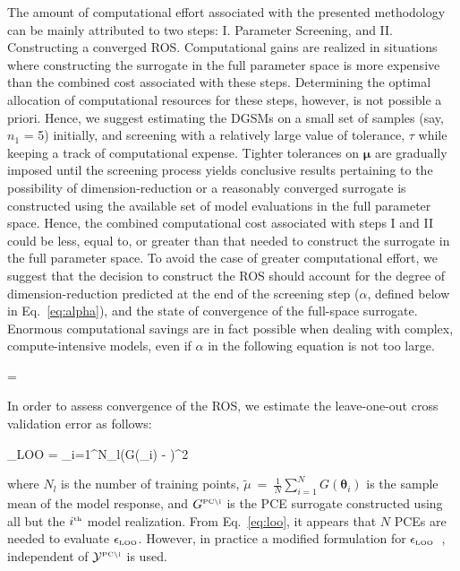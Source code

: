 The amount of computational effort associated with the presented methodology can be mainly attributed to
two steps: I. Parameter Screening, and II. Constructing a converged ROS. Computational gains are realized
in situations where constructing the surrogate in the full parameter space is more expensive than the combined cost
associated with these steps. Determining the optimal allocation of computational resources for these steps, however, 
is not possible a priori. Hence, we suggest estimating the DGSMs on a small set of samples (say, $n_1$ = 5) 
initially, and screening with a relatively large value of tolerance, $\tau$ while keeping a track of computational expense.
Tighter tolerances on $\bm{\mu}$ are
gradually imposed until the screening process yields conclusive results pertaining to the possibility of dimension-reduction
or a reasonably converged surrogate is constructed using the available set of model evaluations in the full parameter space. 
Hence, the combined computational cost associated with steps I and II could be less, equal to, or greater than that needed
to construct the surrogate in the full parameter space. To avoid the case of greater computational effort, we suggest 
that the decision to construct the ROS should account for the degree of dimension-reduction predicted at the end of the
screening step ($\alpha$, defined below in Eq.~\ref{eq:alpha}), and the state of convergence of the full-space surrogate. 
Enormous computational savings are in fact possible when dealing with complex, 
compute-intensive models, even if $\alpha$ in the following equation is
not too large. 

\be
\alpha = 
\label{eq:alpha}
\ee

In order to assess convergence of the ROS, we estimate the leave-one-out cross validation error as
follows:

\be
\epsilon_{\mbox{\tiny LOO}} = 
{\sum\limits_{i=1}^{N_l}\left(G(\bm{\theta}_i) - \widetilde{\mu}\right)^2}
\label{eq:loo}
\ee

\noindent where $N_l$ is the number of training points, 
$\widetilde{\mu}~=~\frac{1}{N}\sum\limits_{i=1}^N G(\bm{\theta}_i)$
is the sample mean of the model response, and $ G^{\mbox{\tiny {PC}\textbackslash i}}$
is the PCE surrogate constructed using all but the $i^{\mbox{\tiny{th}}}$ model realization. 
From Eq.~\ref{eq:loo}, it appears that $N$ PCEs are needed to evaluate $\epsilon_{\mbox{\tiny LOO}}$.
However, in practice a modified formulation for $\epsilon_{\mbox{\tiny LOO}}$~\cite{Blatman:2009},
independent of $\mathcal{Y}^{\mbox{\tiny {PC}\textbackslash i}}$ is used.

